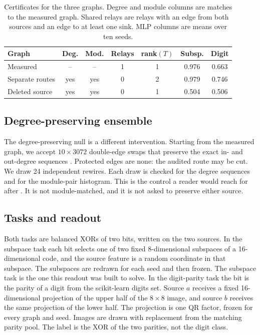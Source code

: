 \documentclass[10pt,twocolumn,letterpaper]{article}
\begin{document}
\begin{table}[t]
\centering
\caption{Certificates for the three graphs. Degree and module columns are matches to the measured graph. Shared relays are relays with an edge from both sources and an edge to at least one sink. MLP columns are means over ten seeds.}
\label{tab:certs}
\footnotesize
\setlength{\tabcolsep}{3.5pt}
\begin{tabular}{lcccccc}
\toprule
Graph & Deg. & Mod. & Relays & rank$(T)$ & Subsp. & Digit \\
\midrule
Measured & -- & -- & 1 & 1 & 0.976 & 0.663 \\
Separate routes & yes & yes & 0 & 2 & 0.979 & 0.746 \\
Deleted source & yes & yes & 0 & 1 & 0.504 & 0.506 \\
\bottomrule
\end{tabular}
\end{table}

\subsection{Degree-preserving ensemble}
\label{sec:ensemble}

The degree-preserving null is a different intervention.
Starting from the measured graph, we accept $10\times 3072$ double-edge swaps that preserve the exact in- and out-degree sequences \cite{maslov2002}.
Protected edges are none: the audited route may be cut.
We draw 24 independent rewires.
Each draw is checked for the degree sequences and for the module-pair histogram.
This is the control a reader would reach for after \cite{dhiman2026}.
It is not module-matched, and it is not asked to preserve either source.

\subsection{Tasks and readout}
\label{sec:tasks}

Both tasks are balanced XORs of two bits, written on the two sources.
In the subspace task each bit selects one of two fixed 8-dimensional subspaces of a 16-dimensional code, and the source feature is a random coordinate in that subspace.
The subspaces are redrawn for each seed and then frozen.
The subspace task is the one this readout was built to solve.
In the digit-parity task the bit is the parity of a digit from the scikit-learn digits set.
Source $a$ receives a fixed 16-dimensional projection of the upper half of the $8\times 8$ image, and source $b$ receives the same projection of the lower half.
The projection is one QR factor, frozen for every graph and seed.
Images are drawn with replacement from the matching parity pool.
The label is the XOR of the two parities, not the digit class.
\end{document}
